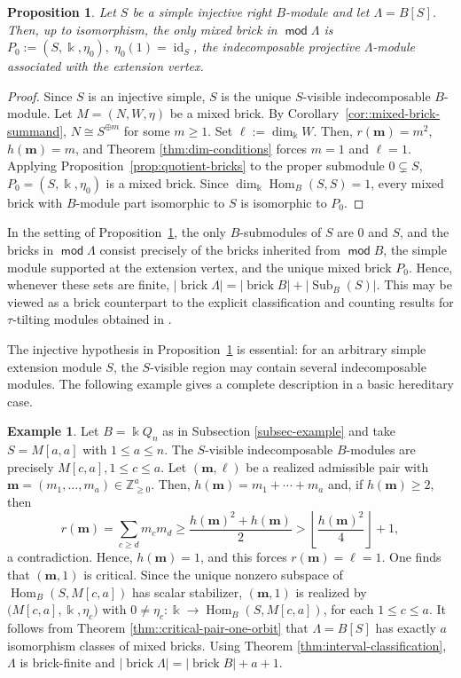 \documentclass[a4,12pt]{amsart}
\numberwithin{equation}{section} %
\def\Hom{\operatorname{Hom}} %
\def\mod{\operatorname{\mathsf{mod}}}
\newtheorem{proposition}[theorem]{Proposition} %
\theoremstyle{definition} %
\newtheorem{example}[theorem]{Example} %
\begin{document}
\begin{proposition}\label{prop:injective-simple}
Let $S$ be a simple injective right $B$-module and let $\Lambda=B[S]$. Then, up to isomorphism, the only mixed brick in $\mod \Lambda$ is $P_0:=(S,\Bbbk,\eta_0),\;\eta_0(1)=\operatorname{id}_S$, the indecomposable projective $\Lambda$-module associated with the extension
vertex. 
\end{proposition}
\begin{proof}
Since $S$ is an injective simple, $S$ is the unique $S$-visible indecomposable $B$-module. Let $M=(N,W,\eta)$ be a mixed brick. By Corollary~\ref{cor::mixed-brick-summand}, $N\cong S^{\oplus m}$ for some
$m\geq1$. Set $\ell:=\dim_{\Bbbk} W$. Then, $r(\mathbf{m})=m^2$, $h(\mathbf{m})=m$, and Theorem \ref{thm:dim-conditions} forces $m=1$ and $\ell=1$. Applying Proposition~\ref{prop:quotient-bricks} to the proper submodule $0\subsetneq S$, $P_0=(S,\Bbbk,\eta_0)$ is a mixed brick. Since $\dim_{\Bbbk}\Hom_B(S,S)=1$, every mixed brick with $B$-module part isomorphic to $S$ is isomorphic to $P_0$. 
\end{proof}


In the setting of Proposition~\ref{prop:injective-simple}, the only $B$-submodules of $S$ are $0$ and $S$, and the bricks in $\mod \Lambda$ consist precisely of the bricks inherited from $\mod B$, the simple module supported at the extension vertex, and the unique mixed brick $P_0$. Hence, whenever these sets are finite, $|\operatorname{brick}\Lambda| = |\operatorname{brick}B| + |\operatorname{Sub}_B(S)|$. This may be viewed as a brick counterpart to the explicit classification and counting results for $\tau$-tilting modules obtained in \cite{Gao-simple-one-point}.

The injective hypothesis in Proposition~\ref{prop:injective-simple} is essential: for an arbitrary simple extension module $S$, the $S$-visible region may contain several indecomposable modules. The following example gives a complete description in a basic hereditary case.

\begin{example}
Let $B=\Bbbk Q_n$ as in Subsection \ref{subsec-example} and take $S=M[a,a]$ with $1\leq a\leq n$. The $S$-visible indecomposable $B$-modules are precisely $M[c,a], 1\leq c\leq a$. Let $(\mathbf{m},\ell)$ be a realized admissible pair with $\mathbf{m}=(m_1,\ldots,m_a)\in \mathbb{Z}_{\geq 0}^a$. Then, $h(\mathbf{m})=m_1+\cdots +m_a$ and, if $h(\mathbf{m})\geq2$, then
\[
r(\mathbf{m})=\sum_{c\geq d}m_cm_d
\geq
\frac{h(\mathbf{m})^2+h(\mathbf{m})}{2}
>
\left\lfloor\frac{h(\mathbf{m})^2}{4}\right\rfloor+1,
\]
a contradiction. Hence,
$h(\mathbf{m})=1$, and this forces $r(\mathbf{m})=\ell=1$. One finds that $(\mathbf{m},1)$ is critical. Since the unique nonzero subspace of $\Hom_B(S,M[c,a])$ has scalar stabilizer, $(\mathbf{m},1)$ is realized by $\bigl(M[c,a],\Bbbk,\eta_c\bigr)$ with $0\neq \eta_c\colon \Bbbk\rightarrow\Hom_B(S,M[c,a])$, for each $1\leq c\leq a$. It follows from Theorem \ref{thm::critical-pair-one-orbit} that $\Lambda=B[S]$ has exactly $a$ isomorphism classes of mixed bricks. Using Theorem \ref{thm:interval-classification}, $\Lambda$ is brick-finite and $|\operatorname{brick}\Lambda| = |\operatorname{brick}B| + a+1$.
\end{example}
\end{document}
